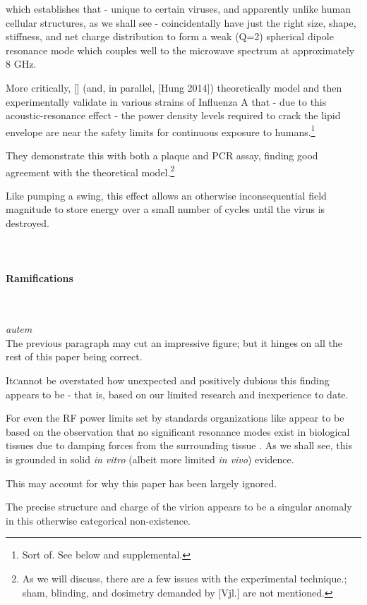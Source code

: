 \documentclass[fleqn,10pt]{article}
\begin{document}
\clearpage	
\begin{multicols}{1}




which establishes that - unique to certain viruses, and apparently unlike human cellular structures, as we shall see - coincidentally have just the right size, shape, stiffness, and net charge distribution to form a weak (Q=2) spherical dipole resonance mode which couples well to the microwave spectrum at approximately 8 GHz.

More critically, [] (and, in parallel, [Hung 2014]) theoretically model and then experimentally validate in various strains of Influenza A that - due to this acoustic-resonance effect - the power density levels required to crack the lipid envelope are near the safety limits for continuous exposure to humans.\footnote{Sort of. See below and supplemental.}

They demonstrate this with both a plaque and PCR assay, finding good agreement with the theoretical model.\footnote{As we will discuss, there are a few issues with the experimental technique.; sham, blinding, and dosimetry demanded by [Vjl.] are not mentioned.}

Like pumping a swing, this effect allows an otherwise inconsequential field magnitude to store energy over a small number of cycles until the virus is destroyed. \\
\\\\

\paragraph{Ramifications}\



\begin{autem}

{\it autem}\\
The previous paragraph may cut an impressive figure; but it hinges on all the rest of this paper being correct.

\end{autem}

\lettrine{It} cannot be overstated how unexpected and positively dubious this finding appears to be - that is, based on our limited research and inexperience to date.

For even the RF power limits set by standards organizations like \cite{ICNIRP2020} \cite{IEEE2006} appear to be based on the observation that no significant resonance modes exist in biological tissues due to damping forces from the surrounding tissue \cite{Vibrational2002}. As we shall see, this is grounded in solid {\it in vitro} (albeit more limited {\it in vivo}) evidence. 

This may account for why this paper has been largely ignored.

The precise structure and charge of the virion appears to be a singular anomaly in this otherwise categorical non-existence.





\end{multicols}
\clearpage
\end{document}
